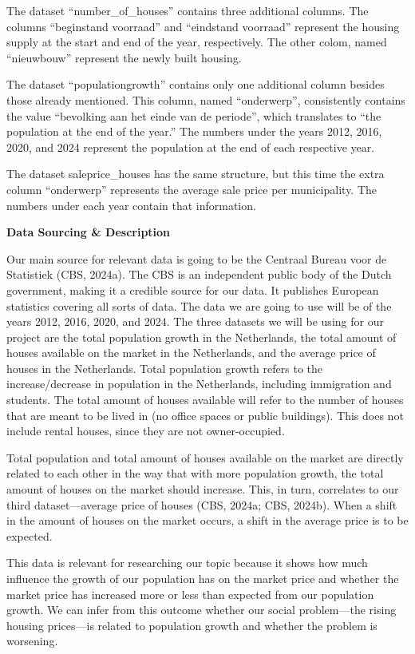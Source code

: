 \documentclass[
]{article}
\begin{document}
The dataset ``number\_of\_houses'' contains three additional columns.
The columns ``beginstand voorraad'' and ``eindstand voorraad'' represent
the housing supply at the start and end of the year, respectively. The
other colom, named ``nieuwbouw'' represent the newly built housing.

The dataset ``populationgrowth'' contains only one additional column
besides those already mentioned. This column, named ``onderwerp'',
consistently contains the value ``bevolking aan het einde van de
periode'', which translates to ``the population at the end of the
year.'' The numbers under the years 2012, 2016, 2020, and 2024 represent
the population at the end of each respective year.

The dataset saleprice\_houses has the same structure, but this time the
extra column ``onderwerp'' represents the average sale price per
municipality. The numbers under each year contain that information.

\textbf{Data Sourcing \& Description}

Our main source for relevant data is going to be the Centraal Bureau
voor de Statistiek (CBS, 2024a). The CBS is an independent public body
of the Dutch government, making it a credible source for our data. It
publishes European statistics covering all sorts of data. The data we
are going to use will be of the years 2012, 2016, 2020, and 2024. The
three datasets we will be using for our project are the total population
growth in the Netherlands, the total amount of houses available on the
market in the Netherlands, and the average price of houses in the
Netherlands. Total population growth refers to the increase/decrease in
population in the Netherlands, including immigration and students. The
total amount of houses available will refer to the number of houses that
are meant to be lived in (no office spaces or public buildings). This
does not include rental houses, since they are not owner-occupied.

\hfill\break
Total population and total amount of houses available on the market are
directly related to each other in the way that with more population
growth, the total amount of houses on the market should increase. This,
in turn, correlates to our third dataset---average price of houses (CBS,
2024a; CBS, 2024b). When a shift in the amount of houses on the market
occurs, a shift in the average price is to be expected.

This data is relevant for researching our topic because it shows how
much influence the growth of our population has on the market price and
whether the market price has increased more or less than expected from
our population growth. We can infer from this outcome whether our social
problem---the rising housing prices---is related to population growth
and whether the problem is worsening.
\end{document}
